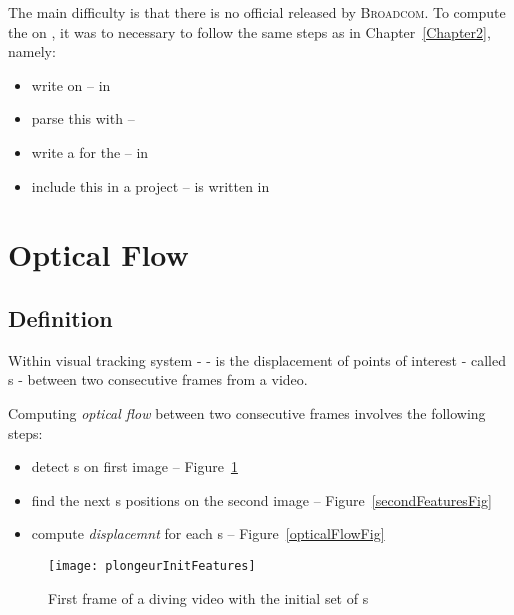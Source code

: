 The main difficulty is that there is no official \api{} released by \textsc{Broadcom}. To compute the \flow{} on \rasp, it was to necessary to follow the same steps as in Chapter~\ref{Chapter2}, namely:
\begin{itemize}
	\item write  on  -- in 
	\item parse this  with  -- 
	\item write a  for the  -- in 
	\item include this \api{} in a  project --  is written in 
\end{itemize}


\section{Optical Flow}

\subsection{Definition}

Within \iBubble{} visual tracking system -  - \flow{} is the displacement of points of interest - called \feat{}s - between two consecutive frames from a video.

Computing \emph{optical flow} between two consecutive frames involves the following steps:
\begin{itemize}
	\item detect \feat{}s on first image -- Figure~\ref{initFeaturesFig}
	\item find the next \feat{}s positions on the second image -- Figure~\ref{secondFeaturesFig}
	\item compute \emph{displacemnt} for each \feat{}s -- Figure~\ref{opticalFlowFig}
\end{itemize}


\begin{figure}[!htbp]
	\centering
	\texttt{[image: plongeurInitFeatures]}
	\caption{First frame of a diving video with the initial set of \feat{}s}
	\label{initFeaturesFig}
\end{figure}
\FloatBarrier



